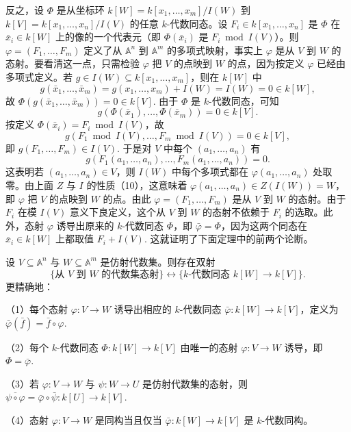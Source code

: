 反之，设 \(\Phi\) 是从坐标环 \(k[W] = k[x_1, \ldots, x_m]/I(W)\) 到 \(k[V] = k[x_1, \ldots, x_n]/I(V)\) 的任意 \(k\)-代数同态。设 \(F_i \in k[x_1, \ldots, x_n]\) 是 \(\Phi\) 在 \(\bar x_i \in k[W]\) 上的像的一个代表元（即 \(\Phi(\bar x_i)\) 是 \(F_i \bmod I(V)\)）。则 \(\varphi = (F_1, \ldots, F_m)\) 定义了从 \(\mathbb{A}^n\) 到 \(\mathbb{A}^m\) 的多项式映射，事实上 \(\varphi\) 是从 \(V\) 到 \(W\) 的态射。要看清这一点，只需检验 \(\varphi\) 把 \(V\) 的点映到 \(W\) 的点，因为按定义 \(\varphi\) 已经由多项式定义。若 \(g \in I(W) \subseteq k[x_1, \ldots, x_m]\)，则在 \(k[W]\) 中
\[
g(\bar x_1, \ldots, \bar x_m) = g(x_1, \ldots, x_m)+I(W) = I(W) = 0 \in k[W],
\]
故 \(\Phi(g(\bar x_1, \ldots, \bar x_m)) = 0 \in k[V]\). 由于 \(\Phi\) 是 \(k\)-代数同态，可知
\[
g(\Phi(\bar x_1), \ldots, \Phi(\bar x_m)) = 0 \in k[V].
\]
按定义 \(\Phi(\bar x_i) = F_i \bmod I(V)\)，故
\[
g(F_1 \bmod I(V), \ldots, F_m \bmod I(V)) = 0 \in k[V],
\]
即 \(g(F_1, \ldots, F_m) \in I(V)\). 于是对 \(V\) 中每个 \((a_1, \ldots, a_n)\) 有
\[
g(F_1(a_1, \ldots, a_n), \ldots, F_m(a_1, \ldots, a_n)) = 0.
\]
这表明若 \((a_1, \ldots, a_n) \in V\)，则 \(I(W)\) 中每个多项式都在 \(\varphi(a_1, \ldots, a_n)\) 处取零。由上面 \(Z\) 与 \(I\) 的性质（10），这意味着 \(\varphi(a_1, \ldots, a_n) \in Z(I(W)) = W\)，即 \(\varphi\) 把 \(V\) 的点映到 \(W\) 的点。由此 \(\varphi = (F_1, \ldots, F_m)\) 是从 \(V\) 到 \(W\) 的态射。由于 \(F_i\) 在模 \(I(V)\) 意义下良定义，这个从 \(V\) 到 \(W\) 的态射不依赖于 \(F_i\) 的选取。此外，态射 \(\varphi\) 诱导出原来的 \(k\)-代数同态 \(\Phi\)，即 \(\bar\varphi = \Phi\)，因为这两个同态在 \(\bar x_i \in k[W]\) 上都取值 \(F_i+I(V)\). 这就证明了下面定理中的前两个论断。

\begin{theorem}\label{thm:15.6}
设 \(V \subseteq \mathbb{A}^n\) 与 \(W \subseteq \mathbb{A}^m\) 是仿射代数集。则存在双射
\[
\{\text{从 } V \text{ 到 } W \text{ 的代数集态射}\} \longleftrightarrow \{k\text{-代数同态 } k[W] \to k[V]\}.
\]
更精确地：

（1）每个态射 \(\varphi : V \to W\) 诱导出相应的 \(k\)-代数同态 \(\bar\varphi : k[W] \to k[V]\)，定义为 \(\bar\varphi(\bar f) = \bar f \circ \varphi\).

（2）每个 \(k\)-代数同态 \(\Phi : k[W] \to k[V]\) 由唯一的态射 \(\varphi : V \to W\) 诱导，即 \(\Phi = \bar\varphi\).

（3）若 \(\varphi : V \to W\) 与 \(\psi : W \to U\) 是仿射代数集的态射，则 \(\overline{\psi \circ \varphi} = \bar\varphi \circ \bar\psi : k[U] \to k[V]\).

（4）态射 \(\varphi : V \to W\) 是同构当且仅当 \(\bar\varphi : k[W] \to k[V]\) 是 \(k\)-代数同构。
\end{theorem}

